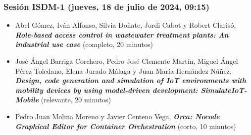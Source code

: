 \begin{frame}
  \frametitle{Sesión ISDM-1 (jueves, 18 de julio de 2024, 09:15)}
\begin{itemize}

\item \small{Abel Gómez, Iván Alfonso, Silvia Doñate, Jordi Cabot y Robert Clarisó}, %
      {\bfseries\itshape Role-based access control in wastewater treatment plants: An industrial use case} %
      \small{(completo, 20 minutos)}

\item \small{José Ángel Barriga Corchero, Pedro José Clemente Martín, Miguel Ángel Pérez Toledano, Elena Jurado Málaga y Juan María Hernández Núñez}, %
      {\bfseries\itshape Design, code generation and simulation of IoT environments with mobility devices by using model-driven development: SimulateIoT-Mobile} %
      \small{(relevante, 20 minutos)}

\item \small{Pedro Juan Molina Moreno y Javier Centeno Vega}, %
      {\bfseries\itshape Orca: Nocode Graphical Editor for Container Orchestration} %
      \small{(corto, 10 minutos)}

\end{itemize}
\end{frame}